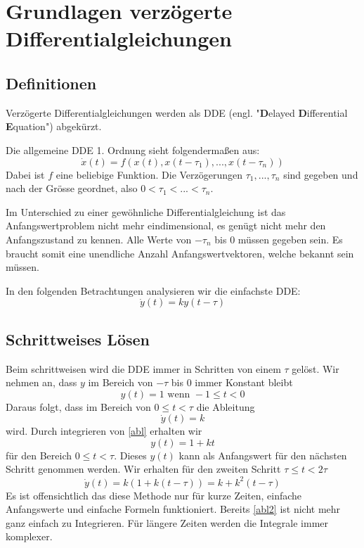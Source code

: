 %
%
%
\section{Grundlagen verzögerte Differentialgleichungen}
\subsection{Definitionen}
Verzögerte Differentialgleichungen werden als DDE (engl. "\textbf{D}elayed \textbf{D}ifferential \textbf{E}quation") abgekürzt.

Die allgemeine DDE 1. Ordnung sieht folgendermaßen aus:
\begin{equation}
	\dot{x}(t) = f(x(t),x(t-\tau_1),...,x(t-\tau_n))
\end{equation}
Dabei ist $f$ eine beliebige Funktion. Die Verzögerungen $\tau_1,...,\tau_n$ sind gegeben und nach der Grösse geordnet, also $0<\tau_1<...<\tau_n$.

Im Unterschied zu einer gewöhnliche Differentialgleichung ist das Anfangswertproblem nicht mehr eindimensional, es genügt nicht mehr den Anfangszustand zu kennen.
Alle Werte von $-\tau_n$ bis $0$ müssen gegeben sein. 
Es braucht somit eine unendliche Anzahl Anfangswertvektoren, welche bekannt sein müssen.

In den folgenden Betrachtungen analysieren wir die einfachste DDE:
\begin{equation}\label{bsp}
\dot{y}(t)=ky(t-\tau)
\end{equation}

\subsection{Schrittweises Lösen}
Beim schrittweisen wird die DDE immer in Schritten von einem $\tau$ gelöst.
Wir nehmen an, dass $y$ im Bereich von $-\tau$ bis $0$ immer Konstant bleibt
\begin{equation}
	y(t)=1 \text{ wenn } -1\le t<0
\end{equation}
Daraus folgt, dass im Bereich von $0\le t<\tau$ die Ableitung
\begin{equation}\label{abl}
	\dot{y}(t)=k
\end{equation}
wird. Durch integrieren von \ref{abl} erhalten wir
\begin{equation}
	y(t)=1+kt
\end{equation}
für den Bereich $0\le t<\tau$. 
Dieses $y(t)$ kann als Anfangswert für den nächsten Schritt genommen werden.
Wir erhalten für den zweiten Schritt  $\tau\le t<2\tau$ 
\begin{equation}\label{abl2}
	\dot{y}(t)=k(1+k(t-\tau))=k+k^2(t-\tau)
\end{equation}
Es ist offensichtlich das diese Methode nur für kurze Zeiten, einfache Anfangswerte und einfache Formeln funktioniert. 
Bereits \ref{abl2} ist nicht mehr ganz einfach zu Integrieren. 
Für längere Zeiten werden die Integrale immer komplexer. %

